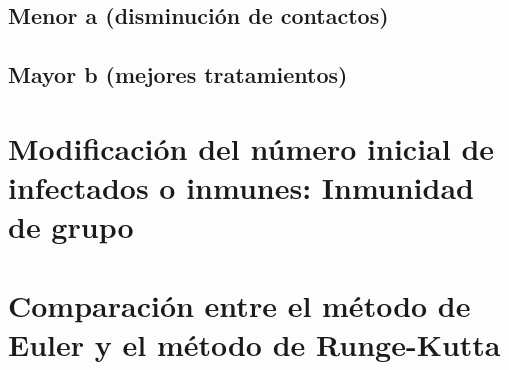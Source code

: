 \documentclass[12pt, spanish]{article}
\begin{document}
\subsection{Menor a (disminución de contactos)}

\subsection{Mayor b (mejores tratamientos)}



\section{Modificación del número inicial de infectados o inmunes: Inmunidad de grupo}

\section{Comparación entre el método de Euler y el método de Runge-Kutta}


%
%
\end{document}
